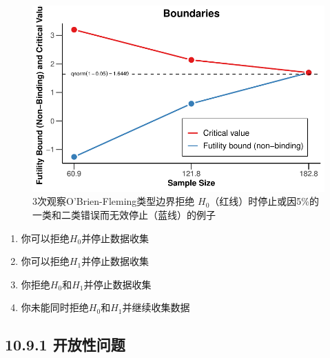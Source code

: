 \documentclass[
  letterpaper,
  DIV=11,
  numbers=noendperiod]{scrreprt}
\providecommand{\tightlist}{%
  \setlength{\itemsep}{0pt}\setlength{\parskip}{0pt}}\usepackage{longtable,booktabs,array}
\begin{document}
\begin{figure}

{\centering \includegraphics[width=1\textwidth,height=\textheight]{10-sequential_files/figure-pdf/fig-futilityq13-1.pdf}

}

\caption{\label{fig-futilityq13}3次观察O'Brien-Fleming类型边界拒绝
\(H_0\)（红线）时停止或因5\%的一类和二类错误而无效停止（蓝线）的例子}

\end{figure}

\begin{enumerate}
\def\labelenumi{\Alph{enumi})}
\tightlist
\item
  你可以拒绝\(H_0\)并停止数据收集
\item
  你可以拒绝\(H_1\)并停止数据收集
\item
  你拒绝\(H_0\)和\(H_1\)并停止数据收集
\item
  你未能同时拒绝\(H_0\)和\(H_1\)并继续收集数据
\end{enumerate}

\hypertarget{ux5f00ux653eux6027ux95eeux9898-2}{%
\subsection{10.9.1 开放性问题}\label{ux5f00ux653eux6027ux95eeux9898-2}}
\end{document}
